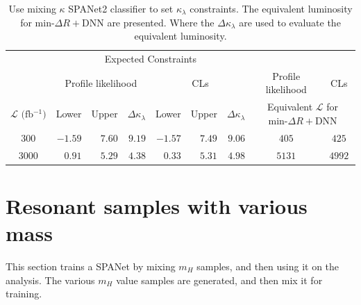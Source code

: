 \documentclass[12pt]{article}
\begin{document}
	\begin{table}[htpb]
		\centering
		\caption{Use mixing $\kappa$ SPANet2 classifier to set $\kappa_\lambda$ constraints. The equivalent luminosity for $\text{min-}\Delta R + \text{DNN}$ are presented. Where the $\Delta \kappa_\lambda$ are used to evaluate the equivalent luminosity.}
		\label{tab:kappa_constraint_equivalent_luminosity}
		\begin{tabular}{c|rrr|rrr|c|c}
		     & \multicolumn{6}{c|}{Expected Constraints}                           &                    &       \\
			 & \multicolumn{3}{c|}{Profile likelihood} & \multicolumn{3}{c|}{CLs}  & Profile likelihood & CLs   \\ \hline
		$\mathcal{L}\text{ (fb$^{-1}$)}$ & Lower   & Upper  & $\Delta\kappa_\lambda$ & Lower   & Upper  & $\Delta\kappa_\lambda$ & \multicolumn{2}{c}{Equivalent $\mathcal{L}$ for $\text{min-}\Delta R + \text{DNN}$} \\ \hline
		300  & $-1.59$ & $7.60$ & $9.19$ & $-1.57$ & $7.49$ & $9.06$ & $405$  & $425$  \\
		3000 & $0.91$  & $5.29$ & $4.38$ & $0.33$  & $5.31$ & $4.98$ & $5131$ & $4992$ \\
		\end{tabular}
	\end{table}
\section{Resonant samples with various mass}%
\label{sec:resonant_samples_with_various_mass}
	
	
	This section trains a SPANet by mixing $m_H$ samples, and then using it on the analysis. The various $m_H$ value samples are generated, and then mix it for training.
\end{document}
